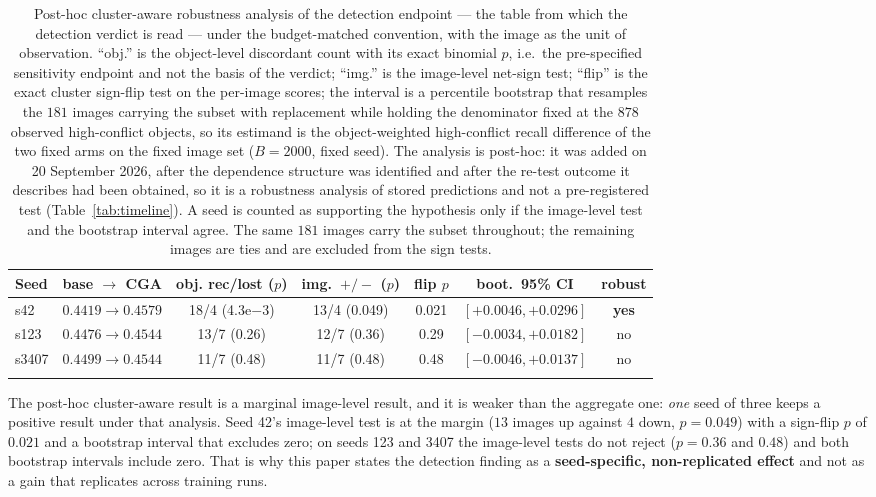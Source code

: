 \documentclass[pdflatex,sn-mathphys-num]{sn-jnl}
\theoremstyle{thmstyleone}%
\theoremstyle{thmstyletwo}%
\theoremstyle{thmstylethree}%
\begin{document}
\begin{table}[t]
\caption{Post-hoc cluster-aware robustness analysis of the detection endpoint --- the table from which the detection verdict is read --- under the budget-matched convention, with the image as the unit of observation. ``obj.'' is the object-level discordant count with its exact binomial $p$, i.e.\ the pre-specified sensitivity endpoint and not the basis of the verdict; ``img.'' is the image-level net-sign test; ``flip'' is the exact cluster sign-flip test on the per-image scores; the interval is a percentile bootstrap that resamples the $181$ images carrying the subset with replacement while holding the denominator fixed at the $878$ observed high-conflict objects, so its estimand is the object-weighted high-conflict recall difference of the two fixed arms on the fixed image set ($B = 2000$, fixed seed). The analysis is post-hoc: it was added on 20 September 2026, after the dependence structure was identified and after the re-test outcome it describes had been obtained, so it is a robustness analysis of stored predictions and not a pre-registered test (Table~\ref{tab:timeline}). A seed is counted as supporting the hypothesis only if the image-level test and the bootstrap interval agree. The same $181$ images carry the subset throughout; the remaining images are ties and are excluded from the sign tests.}
\label{tab:cluster}%
\footnotesize
\setlength{\tabcolsep}{4pt}
\begin{tabular}{@{}lcccccc@{}}
\toprule
Seed & base $\to$ CGA & obj. rec/lost ($p$) & img.\ $+/-$ ($p$) & flip $p$ & boot.\ 95\% CI & robust \\
\midrule
s42   & $0.4419\to0.4579$ & 18/4 (4.3e$-$3) & 13/4 (0.049) & 0.021 & $[+0.0046,+0.0296]$ & \textbf{yes} \\
s123  & $0.4476\to0.4544$ & 13/7 (0.26)    & 12/7 (0.36)  & 0.29  & $[-0.0034,+0.0182]$ & no \\
s3407 & $0.4499\to0.4544$ & 11/7 (0.48)    & 11/7 (0.48)  & 0.48  & $[-0.0046,+0.0137]$ & no \\
\botrule
\end{tabular}
\end{table}

The post-hoc cluster-aware result is a marginal image-level result, and it is weaker than the aggregate one: \emph{one} seed of three keeps a positive result under that analysis. Seed 42's image-level test is at the margin ($13$ images up against $4$ down, $p = 0.049$) with a sign-flip $p$ of $0.021$ and a bootstrap interval that excludes zero; on seeds 123 and 3407 the image-level tests do not reject ($p = 0.36$ and $0.48$) and both bootstrap intervals include zero. That is why this paper states the detection finding as a \textbf{seed-specific, non-replicated effect} and not as a gain that replicates across training runs.
\end{document}
